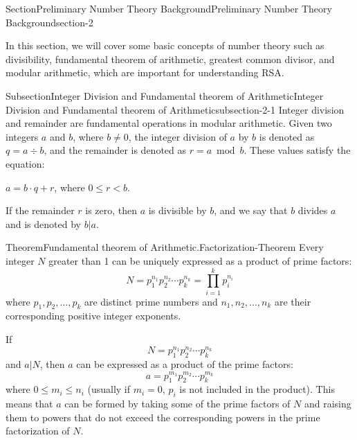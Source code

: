 \documentclass[oneside,12pt,]{article}
\numberwithin{equation}{section}
\begin{document}
\begin{sectionptx}{Section}{Preliminary Number Theory Background}{}{Preliminary Number Theory Background}{}{}{section-2}
\begin{introduction}{}%
In this section, we will cover some basic concepts of number theory such as divisibility, fundamental theorem of arithmetic, greatest common divisor, and modular arithmetic, which are important for understanding RSA.%
\end{introduction}%
%
%
\typeout{************************************************}
\typeout{************************************************}
%
\begin{subsectionptx}{Subsection}{Integer Division and Fundamental theorem of Arithmetic}{}{Integer Division and Fundamental theorem of Arithmetic}{}{}{subsection-2-1}
Integer division and remainder are fundamental operations in modular arithmetic. Given two integers \(a\) and \(b\), where \(b \neq 0\), the integer division of \(a\) by \(b\) is denoted as \(q = a \div b\), and the remainder is denoted as \(r = a \bmod b\). These values satisfy the equation:%
\par
\(a = b \cdot q + r\), where \(0 \leq r < b\).%
\par
If the remainder \(r\) is zero, then \(a\) is divisible by \(b\), and we say that \(b\) divides \(a\) and is denoted by \(b|a\).%
\begin{theorem}{Theorem}{Fundamental theorem of Arithmetic.}{}{Factorization-Theorem}%
Every integer \(N\) greater than 1 can be uniquely expressed as a product of prime factors:%
\begin{equation}
N = p_1^{n_1} p_2^{n_2} \cdots p_k^{n_k} = \prod_{i=1}^{k} p_i^{n_i}\label{Factorization-Theorem-2-1-2}
\end{equation}
where \(p_1,p_2,\ldots,p_k\) are distinct prime numbers and \(n_1,n_2,\ldots,n_k\) are their corresponding positive integer exponents.%
\end{theorem}
If%
\begin{equation*}
N = p_1^{n_1} p_2^{n_2} \cdots p_k^{n_k}
\end{equation*}
and \(a|N\), then \(a\) can be expressed as a product of the prime factors:%
\begin{equation*}
a = p_1^{m_1} p_2^{m_2} \cdots p_k^{m_k}
\end{equation*}
where \(0 \leq m_i \leq n_i\) (usually if \(m_i = 0\), \(p_i\) is not included in the product). This means that \(a\) can be formed by taking some of the prime factors of \(N\) and raising them to powers that do not exceed the corresponding powers in the prime factorization of \(N\).%

\end{subsectionptx}
\end{sectionptx}
\end{document}
